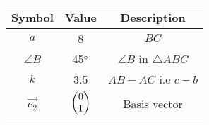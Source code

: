 \begin{tabular}{|c|c|c|}
  \hline
  \textbf{Symbol}&\textbf{Value}&\textbf{Description}\\
  \hline
  $a$ & 8 & $BC$\\
  \hline
	$\angle{B}$ & 45$\degree{}$ & $\angle{B}$ in $\triangle$$ABC$ \\
  \hline
	$k$ & 3.5 & $AB-AC$ i.e $c-b$ \\
  \hline 
	$\vec{e_2}$ & $\begin{pmatrix}
			0\\
			1\\
			\end{pmatrix}$ & Basis vector\\
 \hline			
\end{tabular}
